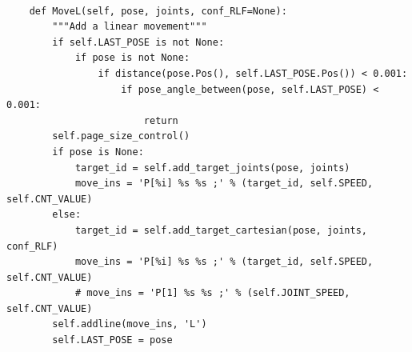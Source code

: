 \label{code:originalMoveL}
\begin{verbatim}

    def MoveL(self, pose, joints, conf_RLF=None):
        """Add a linear movement"""
        if self.LAST_POSE is not None:
            if pose is not None:
                if distance(pose.Pos(), self.LAST_POSE.Pos()) < 0.001:
                    if pose_angle_between(pose, self.LAST_POSE) < 0.001:
                        return
        self.page_size_control()
        if pose is None:
            target_id = self.add_target_joints(pose, joints)
            move_ins = 'P[%i] %s %s ;' % (target_id, self.SPEED, self.CNT_VALUE)
        else:
            target_id = self.add_target_cartesian(pose, joints, conf_RLF)
            move_ins = 'P[%i] %s %s ;' % (target_id, self.SPEED, self.CNT_VALUE)
            # move_ins = 'P[1] %s %s ;' % (self.JOINT_SPEED, self.CNT_VALUE)
        self.addline(move_ins, 'L')
        self.LAST_POSE = pose

\end{verbatim}





